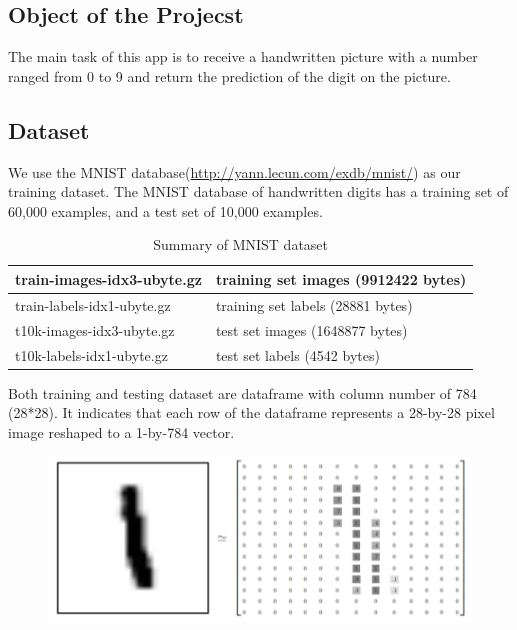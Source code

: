 \documentclass[12pt,hyperref,]{ctexart}
\begin{document}
\subsection{Object of the Projecst}\label{object-of-the-projecst}

The main task of this app is to receive a handwritten picture with a
number ranged from 0 to 9 and return the prediction of the digit on the
picture.

\subsection{Dataset}\label{dataset}

We use the MNIST database(\url{http://yann.lecun.com/exdb/mnist/}) as
our training dataset. The MNIST database of handwritten digits has a
training set of 60,000 examples, and a test set of 10,000 examples.

\begin{table}[H]
\caption{Summary of MNIST dataset}
\begin{center}
\begin{tabular}{|p{6cm}|p{8cm}|}
\hline
train-images-idx3-ubyte.gz & training set images (9912422 bytes) \\ \hline
train-labels-idx1-ubyte.gz &  training set labels (28881 bytes)\\ \hline
t10k-images-idx3-ubyte.gz &  test set images (1648877 bytes) \\ \hline
t10k-labels-idx1-ubyte.gz &   test set labels (4542 bytes)\\
\hline
\end{tabular}
\end{center}
\end{table}

Both training and testing dataset are dataframe with column number of
784 (28*28). It indicates that each row of the dataframe represents a
28-by-28 pixel image reshaped to a 1-by-784 vector.

\begin{figure}[H]
\centering
\includegraphics[width=5in]{pre.png}
\label{demo}
\end{figure}
\end{document}
